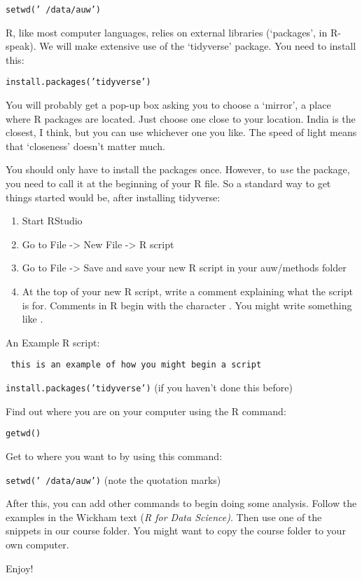 \documentclass[
  letterpaper,
  DIV=11,
  numbers=noendperiod]{scrartcl}
\providecommand{\tightlist}{%
  \setlength{\itemsep}{0pt}\setlength{\parskip}{0pt}}\usepackage{longtable,booktabs,array}
\begin{document}
\texttt{setwd('~/data/auw')}

\textsf{R}, like most computer languages, relies on external libraries
(`packages', in \textsf{R}-speak). We will make extensive use of the
`\textsf{tidyverse}' package. You need to install this:

\texttt{install.packages('tidyverse')}

You will probably get a pop-up box asking you to choose a `mirror', a
place where \textsf{R} packages are located. Just choose one close to
your location. India is the closest, I think, but you can use whichever
one you like. The speed of light means that `closeness' doesn't matter
much.

You should only have to install the packages once. However, to
\emph{use} the package, you need to call it at the beginning of your
\textsf{R} file. So a standard way to get things started would be, after
installing \textsf{tidyverse}:

\begin{enumerate}
\def\labelenumi{\arabic{enumi}.}
\tightlist
\item
  Start RStudio
\item
  Go to File -\textgreater{} New File -\textgreater{} R script
\item
  Go to File -\textgreater{} Save and save your new R script in your
  auw/methods folder
\item
  At the top of your new R script, write a comment explaining what the
  script is for. Comments in \textsf{R} begin with the character
  \verbatim{#}. You might write something like
  .
\end{enumerate}

An Example \textsf{R} script:

\texttt{ this is an example of how you might begin a script}

\texttt{install.packages('tidyverse')} (if you haven't done this before)

Find out where you are on your computer using the R command:

\texttt{getwd()}

Get to where you want to by using this command:

\texttt{setwd('~/data/auw')} (note the quotation marks)

After this, you can add other commands to begin doing some analysis.
Follow the examples in the Wickham text
(\emph{\textsf{R} for Data Science)}. Then use one of the snippets in
our course folder. You might want to copy the course folder to your own
computer.

Enjoy!
\end{document}
